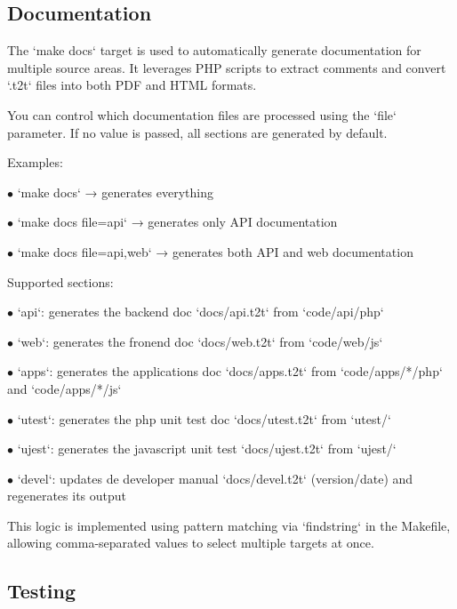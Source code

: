\documentclass[a4paper]{article}
\begin{document}
\hypertarget{toc43}{}
\subsection{Documentation}

The `make docs` target is used to automatically generate documentation for multiple source areas. It leverages PHP scripts to extract comments and convert `.t2t` files into both PDF and HTML formats.

You can control which documentation files are processed using the `file` parameter. If no value is passed, all sections are generated by default.

Examples:

\begin{compactitem}
\item[\color{myblue}$\bullet$] `make docs` → generates everything
\item[\color{myblue}$\bullet$] `make docs file=api` → generates only API documentation
\item[\color{myblue}$\bullet$] `make docs file=api,web` → generates both API and web documentation
\end{compactitem}

Supported sections:

\begin{compactitem}
\item[\color{myblue}$\bullet$] `api`: generates the backend doc `docs/api.t2t` from `code/api/php`
\item[\color{myblue}$\bullet$] `web`: generates the fronend doc `docs/web.t2t` from `code/web/js`
\item[\color{myblue}$\bullet$] `apps`: generates the applications doc `docs/apps.t2t` from `code/apps/*/php` and `code/apps/*/js`
\item[\color{myblue}$\bullet$] `utest`: generates the php unit test doc `docs/utest.t2t` from `utest/`
\item[\color{myblue}$\bullet$] `ujest`: generates the javascript unit test `docs/ujest.t2t` from `ujest/`
\item[\color{myblue}$\bullet$] `devel`: updates de developer manual `docs/devel.t2t` (version/date) and regenerates its output
\end{compactitem}

This logic is implemented using pattern matching via `findstring` in the Makefile, allowing comma-separated values to select multiple targets at once.

\hypertarget{toc44}{}
\subsection{Testing}
\end{document}
